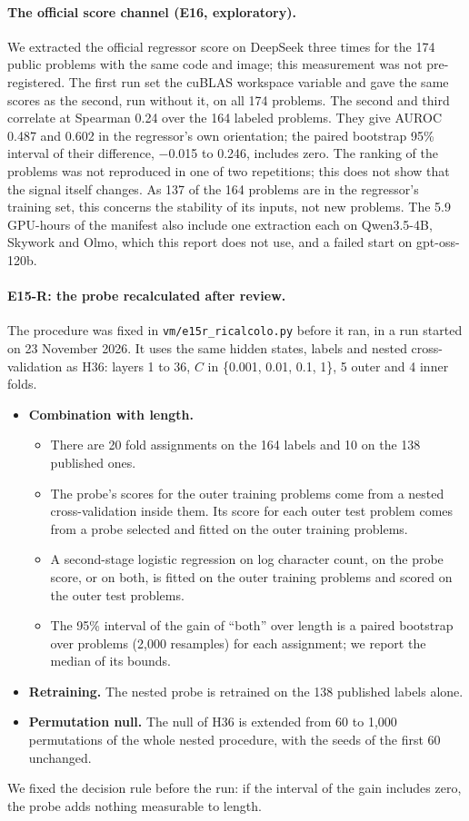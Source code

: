 \paragraph{The official score channel (E16, exploratory).} We extracted the official regressor score on DeepSeek three times for the 174 public problems with the same code and image; this measurement was not pre-registered. The first run set the cuBLAS workspace variable and gave the same scores as the second, run without it, on all 174 problems. The second and third correlate at Spearman 0.24 over the 164 labeled problems. They give AUROC 0.487 and 0.602 in the regressor's own orientation; the paired bootstrap 95\% interval of their difference, $-$0.015 to 0.246, includes zero. The ranking of the problems was not reproduced in one of two repetitions; this does not show that the signal itself changes. As 137 of the 164 problems are in the regressor's training set, this concerns the stability of its inputs, not new problems. The 5.9 GPU-hours of the manifest also include one extraction each on Qwen3.5-4B, Skywork and Olmo, which this report does not use, and a failed start on gpt-oss-120b.

\paragraph{E15-R: the probe recalculated after review.} The procedure was fixed in \texttt{vm/e15r\_ricalcolo.py} before it ran, in a run started on 23 November 2026. It uses the same hidden states, labels and nested cross-validation as H36: layers 1 to 36, $C$ in \{0.001, 0.01, 0.1, 1\}, 5 outer and 4 inner folds.
\begin{itemize}
\item \textbf{Combination with length.}
  \begin{itemize}
  \item There are 20 fold assignments on the 164 labels and 10 on the 138 published ones.
  \item The probe's scores for the outer training problems come from a nested cross-validation inside them. Its score for each outer test problem comes from a probe selected and fitted on the outer training problems.
  \item A second-stage logistic regression on log character count, on the probe score, or on both, is fitted on the outer training problems and scored on the outer test problems.
  \item The 95\% interval of the gain of ``both'' over length is a paired bootstrap over problems (2,000 resamples) for each assignment; we report the median of its bounds.
  \end{itemize}
\item \textbf{Retraining.} The nested probe is retrained on the 138 published labels alone.
\item \textbf{Permutation null.} The null of H36 is extended from 60 to 1,000 permutations of the whole nested procedure, with the seeds of the first 60 unchanged.
\end{itemize}
We fixed the decision rule before the run: if the interval of the gain includes zero, the probe adds nothing measurable to length.

